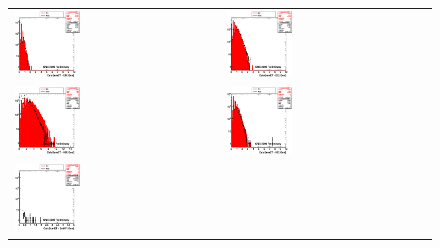 \begin{figure}[h!]
 \centering
 \begin{tabular}{ll}
  \includegraphics[width=0.33\textwidth]{plots_CaloNoise/h_caloSumetEB.eps} &
  \includegraphics[width=0.33\textwidth]{plots_CaloNoise/h_caloSumetEE.eps} \\
  \includegraphics[width=0.33\textwidth]{plots_CaloNoise/h_caloSumetHB.eps} &
  \includegraphics[width=0.33\textwidth]{plots_CaloNoise/h_caloSumetHE.eps} \\
  \includegraphics[width=0.33\textwidth]{plots_CaloNoise/h_caloSumetEmHF.eps} &

\end{tabular}
\end{figure}
